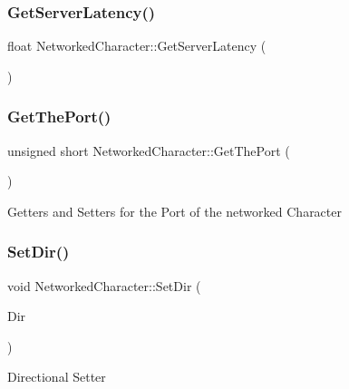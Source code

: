 \subsubsection{\texorpdfstring{Get\+Server\+Latency()}{GetServerLatency()}}
{\footnotesize\ttfamily float Networked\+Character\+::\+Get\+Server\+Latency (\begin{DoxyParamCaption}{ }\end{DoxyParamCaption})\hspace{0.3cm}{\ttfamily [inline]}}

\hypertarget{class_networked_character_af53749e10edfbbdb5ccbccd238d27091}{}\label{class_networked_character_af53749e10edfbbdb5ccbccd238d27091} 
\subsubsection{\texorpdfstring{Get\+The\+Port()}{GetThePort()}}
{\footnotesize\ttfamily unsigned short Networked\+Character\+::\+Get\+The\+Port (\begin{DoxyParamCaption}{ }\end{DoxyParamCaption})\hspace{0.3cm}{\ttfamily [inline]}}

Getters and Setters for the Port of the networked Character \hypertarget{class_networked_character_a41e76bfe05d14ebc9237031d149d6d0c}{}\label{class_networked_character_a41e76bfe05d14ebc9237031d149d6d0c} 
\subsubsection{\texorpdfstring{Set\+Dir()}{SetDir()}}
{\footnotesize\ttfamily void Networked\+Character\+::\+Set\+Dir (\begin{DoxyParamCaption}\item[{\hyperlink{_player_character_8h_af5420be377752b383864a169dfd7ba10}{Player\+Direction}}]{Dir }\end{DoxyParamCaption})\hspace{0.3cm}{\ttfamily [inline]}}

Directional Setter \hypertarget{class_networked_character_a14c6d02226b324fa689dd758da7dcb34}{}\label{class_networked_character_a14c6d02226b324fa689dd758da7dcb34} 
